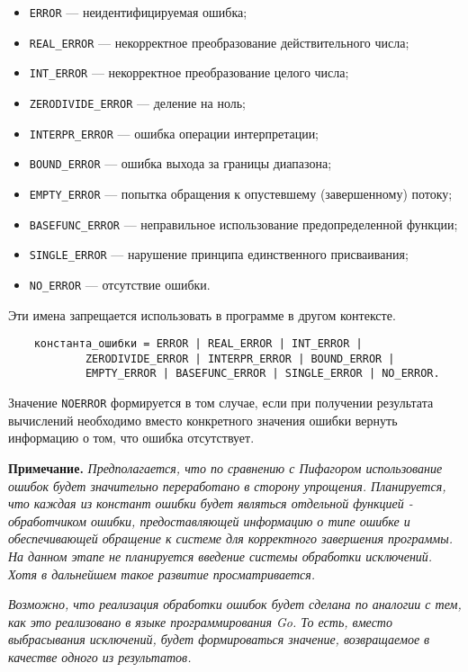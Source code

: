 {\begin{itemize}
	\item \verb|ERROR| --- неидентифицируемая ошибка;
	\item \verb|REAL_ERROR| --- некорректное преобразование действительного числа;
	\item \verb|INT_ERROR| --- некорректное преобразование целого числа;
	\item \verb|ZERODIVIDE_ERROR| --- деление на ноль;
	\item \verb|INTERPR_ERROR| --- ошибка операции интерпретации;
	\item \verb|BOUND_ERROR| --- ошибка выхода за границы диапазона;
    \item \verb|EMPTY_ERROR| --- попытка обращения к опустевшему (завершенному) потоку;
	\item \verb|BASEFUNC_ERROR| --- неправильное использование предопределенной функции;
    \item \verb|SINGLE_ERROR| --- нарушение принципа единственного присваивания;
	\item \verb|NO_ERROR| --- отсутствие ошибки.
\end{itemize}

Эти имена запрещается использовать в программе в другом контексте.

\begin{verbatim}
    константа_ошибки = ERROR | REAL_ERROR | INT_ERROR |
            ZERODIVIDE_ERROR | INTERPR_ERROR | BOUND_ERROR |
            EMPTY_ERROR | BASEFUNC_ERROR | SINGLE_ERROR | NO_ERROR.
\end{verbatim}

Значение \verb|NOERROR| формируется в том случае, если при получении результата вычислений необходимо вместо конкретного значения ошибки вернуть информацию о том, что ошибка отсутствует.

\textbf{Примечание.}
\textit{Предполагается, что по сравнению с Пифагором использование ошибок будет значительно переработано в сторону упрощения. Планируется, что каждая из констант ошибки будет являться отдельной функцией - обработчиком ошибки, предоставляющей информацию о типе ошибке и обеспечивающей обращение к системе для корректного завершения программы. На данном этапе не планируется введение системы обработки исключений. Хотя в дальнейшем такое развитие просматривается.}

\textit{Возможно, что реализация обработки ошибок будет сделана по аналогии с тем, как это реализовано в языке программирования Go. То есть, вместо выбрасывания исключений, будет формироваться значение, возвращаемое в качестве одного из результатов.}

}

